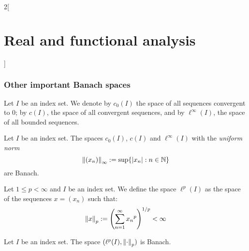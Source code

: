 \documentclass[../../../main_math.tex]{subfiles}
\begin{document}
\begin{multicols}{2}[\section{Real and functional analysis}]
  \subsubsection{Other important Banach spaces}
  \begin{definition}
    Let $I$ be an index set. We denote by $c_0(I)$ the space of all sequences convergent to 0; by $c(I)$, the space of all convergent sequences, and by $\ell^\infty(I)$, the space of all bounded sequences.
  \end{definition}
  \begin{proposition}
    Let $I$ be an index set. The spaces $c_0(I)$, $c(I)$ and $\ell^\infty(I)$ with the \emph{uniform norm} $$\left\|(x_n)\right\|_\infty:=\sup\{\abs{x_n}:n\in\mathbb{N}\}$$
    are Banach.
  \end{proposition}
  \begin{definition}
    Let $1\leq p<\infty$ and $I$ be an index set. We define the space $\ell^p(I)$ as the space of the sequences $x=(x_n)$ such that:
    $$\left\|x\right\|_p:={\left(\sum_{n=1}^\infty{x_n}^p\right)}^{1/p}<\infty$$
  \end{definition}
  \begin{proposition}
    Let $I$ be an index set. The space $(\ell^p(I),\left\|\cdot\right\|_p)$ is Banach.
  \end{proposition}

\end{multicols}
\end{document}
